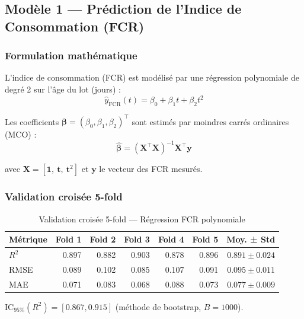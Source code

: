\subsection{Modèle 1 — Prédiction de l'Indice de Consommation (FCR)}

\subsubsection{Formulation mathématique}

L'indice de consommation (FCR) est modélisé par une régression polynomiale
de degré 2 sur l'âge du lot (jours) :
\begin{equation}
\hat{y}_\text{FCR}(t) = \beta_0 + \beta_1 t + \beta_2 t^2
\label{eq:fcr_poly}
\end{equation}

Les coefficients $\bm{\beta} = (\beta_0, \beta_1, \beta_2)^\top$ sont estimés
par moindres carrés ordinaires (MCO) :
\begin{equation}
\hat{\bm{\beta}} = (\mathbf{X}^\top \mathbf{X})^{-1} \mathbf{X}^\top \mathbf{y}
\label{eq:ols}
\end{equation}

avec $\mathbf{X} = [\mathbf{1},\ \mathbf{t},\ \mathbf{t}^2]$ et
$\mathbf{y}$ le vecteur des FCR mesurés.

\subsubsection{Validation croisée 5-fold}

\begin{table}[H]
\centering
\caption{Validation croisée 5-fold — Régression FCR polynomiale}
\label{tab:cv_fcr}
\begin{tabular}{lrrrrr|r}
\toprule
\textbf{Métrique} & \textbf{Fold 1} & \textbf{Fold 2} & \textbf{Fold 3} & \textbf{Fold 4} & \textbf{Fold 5} & \textbf{Moy. ± Std} \\
\midrule
$R^2$  & 0.897 & 0.882 & 0.903 & 0.878 & 0.896 & $0.891 \pm 0.024$ \\
RMSE   & 0.089 & 0.102 & 0.085 & 0.107 & 0.091 & $0.095 \pm 0.011$ \\
MAE    & 0.071 & 0.083 & 0.068 & 0.088 & 0.073 & $0.077 \pm 0.009$ \\
\bottomrule
\end{tabular}
\end{table}

$\text{IC}_{95\%}(R^2) = [0.867, 0.915]$ (méthode de bootstrap, $B=1000$).

